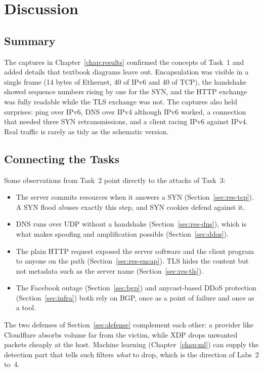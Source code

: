 \chapter{Discussion}\label{chap:discussion}

\section{Summary}

The captures in Chapter~\ref{chap:results} confirmed the concepts of Task~1 and added details that textbook diagrams leave out. Encapsulation was visible in a single frame (14 bytes of Ethernet, 40 of IPv6 and 40 of TCP), the handshake showed sequence numbers rising by one for the SYN, and the HTTP exchange was fully readable while the TLS exchange was not. The captures also held surprises: ping over IPv6, DNS over IPv4 although IPv6 worked, a connection that needed three SYN retransmissions, and a client racing IPv6 against IPv4. Real traffic is rarely as tidy as the schematic version.

\section{Connecting the Tasks}

Some observations from Task~2 point directly to the attacks of Task~3:

\begin{itemize}
	\item The server commits resources when it answers a SYN (Section~\ref{sec:res-tcp}). A SYN flood abuses exactly this step, and SYN cookies defend against it.
	\item DNS runs over UDP without a handshake (Section~\ref{sec:res-dns}), which is what makes spoofing and amplification possible (Section~\ref{sec:ddos}).
	\item The plain HTTP request exposed the server software and the client program to anyone on the path (Section~\ref{sec:res-encap}). TLS hides the content but not metadata such as the server name (Section~\ref{sec:res-tls}).
	\item The Facebook outage (Section~\ref{sec:bgp}) and anycast-based DDoS protection (Section~\ref{sec:infra}) both rely on BGP, once as a point of failure and once as a tool.
\end{itemize}

The two defenses of Section~\ref{sec:defense} complement each other: a provider like Cloudflare absorbs volume far from the victim, while XDP drops unwanted packets cheaply at the host. Machine learning (Chapter~\ref{chap:ml}) can supply the detection part that tells such filters \emph{what} to drop, which is the direction of Labs~2 to~4.

